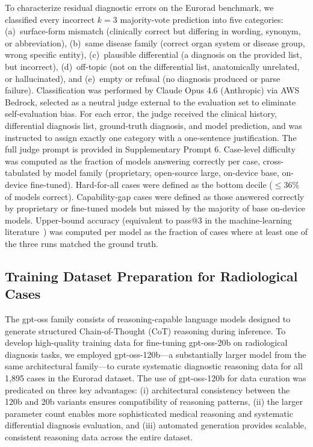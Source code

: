 \documentclass[10pt,journal,compsoc, onecolumn]{IEEEtran}
\begin{document}
To characterize residual diagnostic errors on the Eurorad benchmark, we classified every incorrect $k=3$ majority-vote prediction into five categories: (a)~surface-form mismatch (clinically correct but differing in wording, synonym, or abbreviation), (b)~same disease family (correct organ system or disease group, wrong specific entity), (c)~plausible differential (a diagnosis on the provided list, but incorrect), (d)~off-topic (not on the differential list, anatomically unrelated, or hallucinated), and (e)~empty or refusal (no diagnosis produced or parse failure). Classification was performed by Claude Opus 4.6 (Anthropic) via AWS Bedrock, selected as a neutral judge external to the evaluation set to eliminate self-evaluation bias. For each error, the judge received the clinical history, differential diagnosis list, ground-truth diagnosis, and model prediction, and was instructed to assign exactly one category with a one-sentence justification. The full judge prompt is provided in Supplementary Prompt 6. Case-level difficulty was computed as the fraction of models answering correctly per case, cross-tabulated by model family (proprietary, open-source large, on-device base, on-device fine-tuned). Hard-for-all cases were defined as the bottom decile ($\leq$36\% of models correct). Capability-gap cases were defined as those answered correctly by proprietary or fine-tuned models but missed by the majority of base on-device models. Upper-bound accuracy (equivalent to pass@3 in the machine-learning literature~\cite{chen2021codex}) was computed per model as the fraction of cases where at least one of the three runs matched the ground truth.


\subsection*{Training Dataset Preparation for Radiological Cases}

The gpt-oss family consists of reasoning-capable language models designed to generate structured Chain-of-Thought (CoT) reasoning during inference. To develop high-quality training data for fine-tuning gpt-oss-20b on radiological diagnosis tasks, we employed gpt-oss-120b---a substantially larger model from the same architectural family---to curate systematic diagnostic reasoning data for all 1,895 cases in the Eurorad dataset. The use of gpt-oss-120b for data curation was predicated on three key advantages: (i) architectural consistency between the 120b and 20b variants ensures compatibility of reasoning patterns, (ii) the larger parameter count enables more sophisticated medical reasoning and systematic differential diagnosis evaluation, and (iii) automated generation provides scalable, consistent reasoning data across the entire dataset.
\end{document}
